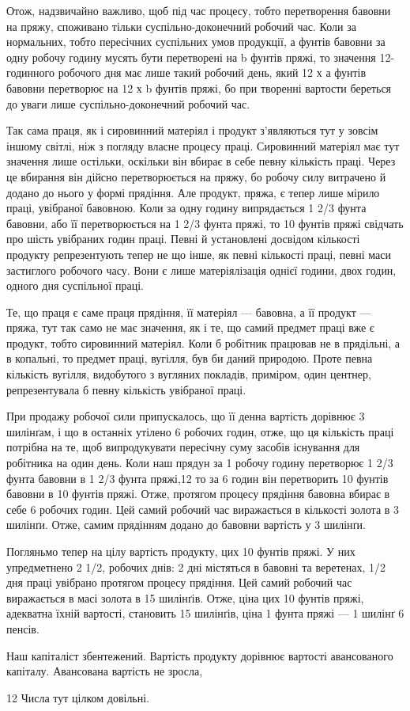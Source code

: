 Отож, надзвичайно важливо, щоб під час процесу, тобто перетворення
бавовни на пряжу, споживано тільки суспільно-доконечний
робочий час. Коли за нормальних, тобто пересічних
суспільних умов продукції, а фунтів бавовни за одну робочу
годину мусять бути перетворені на b фунтів пряжі, то значення
12-годинного робочого дня має лише такий робочий день, який
12 х а фунтів бавовни перетворює на 12 х b фунтів пряжі, бо
при творенні вартости береться до уваги лише суспільно-доконечний
робочий час.

Так сама праця, як і сировинний матеріял і продукт з’являються
тут у зовсім іншому світлі, ніж з погляду власне процесу
праці. Сировинний матеріял має тут значення лише остільки,
оскільки він вбирає в себе певну кількість праці. Через це вбирання
він дійсно перетворюється на пряжу, бо робочу силу витрачено
й додано до нього у формі прядіння. Але продукт, пряжа,
є тепер лише мірило праці, увібраної бавовною. Коли за одну
годину випрядається 1 2/3 фунта бавовни, або її перетворюється на
1 2/3 фунта пряжі, то 10 фунтів пряжі свідчать про шість увібраних
годин праці. Певні й установлені досвідом кількості продукту
репрезентують тепер не що інше, як певні кількості праці, певні
маси застиглого робочого часу. Вони є лише матеріялізація однієї
години, двох годин, одного дня суспільної праці.

Те, що праця є саме праця прядіння, її матеріял — бавовна,
а її продукт — пряжа, тут так само не має значення, як і те, що
самий предмет праці вже є продукт, тобто сировинний матеріял.
Коли б робітник працював не в прядільні, а в копальні, то предмет
праці, вугілля, був би даний природою. Проте певна кількість
вугілля, видобутого з вугляних покладів, приміром, один
центнер, репрезентувала б певну кількість увібраної праці.

При продажу робочої сили припускалось, що її денна вартість
дорівнює 3 шилінґам, і що в останніх утілено 6 робочих годин,
отже, що ця кількість праці потрібна на те, щоб випродукувати
пересічну суму засобів існування для робітника на один день.
Коли наш прядун за 1 робочу годину перетворює 1 2/3 фунта
бавовни в 1 2/3 фунта пряжі,12 то за 6 годин він перетворить
10 фунтів бавовни в 10 фунтів пряжі. Отже, протягом процесу
прядіння бавовна вбирає в себе 6 робочих годин. Цей самий робочий
час виражається в кількості золота в 3 шилінґи. Отже, самим
прядінням додано до бавовни вартість у 3 шилінґи.

Погляньмо тепер на цілу вартість продукту, цих 10 фунтів
пряжі. У них упредметнено 2 1/2, робочих днів: 2 дні містяться в
бавовні та веретенах, 1/2 дня праці увібрано протягом процесу прядіння.
Цей самий робочий час виражається в масі золота в 15 шилінґів.
Отже, ціна цих 10 фунтів пряжі, адекватна їхній вартості,
становить 15 шилінґів, ціна 1 фунта пряжі — 1 шилінґ 6 пенсів.

Наш капіталіст збентежений. Вартість продукту дорівнює
вартості авансованого капіталу. Авансована вартість не зросла,

12 Числа тут цілком довільні.
\parbreak{}  %
